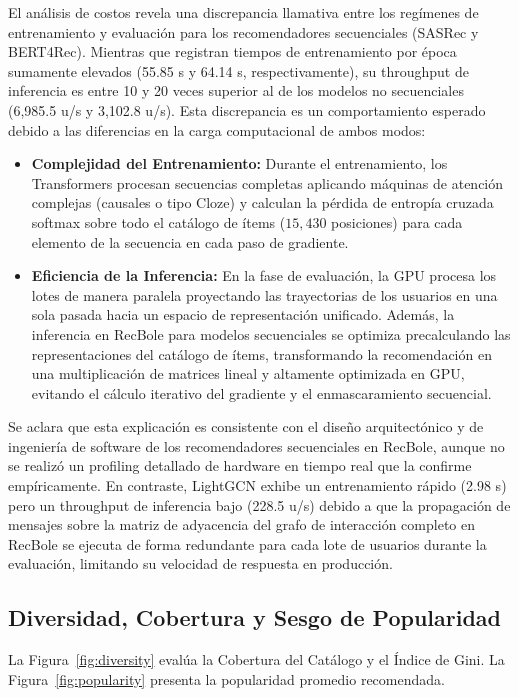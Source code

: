 \documentclass[journal]{IEEEtran}
\begin{document}
El análisis de costos revela una discrepancia llamativa entre los regímenes de entrenamiento y evaluación para los recomendadores secuenciales (SASRec y BERT4Rec). Mientras que registran tiempos de entrenamiento por época sumamente elevados (55.85 s y 64.14 s, respectivamente), su throughput de inferencia es entre 10 y 20 veces superior al de los modelos no secuenciales (6,985.5 u/s y 3,102.8 u/s). Esta discrepancia es un comportamiento esperado debido a las diferencias en la carga computacional de ambos modos:
\begin{itemize}
    \item \textbf{Complejidad del Entrenamiento:} Durante el entrenamiento, los Transformers procesan secuencias completas aplicando máquinas de atención complejas (causales o tipo Cloze) y calculan la pérdida de entropía cruzada softmax sobre todo el catálogo de ítems ($15,430$ posiciones) para cada elemento de la secuencia en cada paso de gradiente.
    \item \textbf{Eficiencia de la Inferencia:} En la fase de evaluación, la GPU procesa los lotes de manera paralela proyectando las trayectorias de los usuarios en una sola pasada hacia un espacio de representación unificado. Además, la inferencia en RecBole para modelos secuenciales se optimiza precalculando las representaciones del catálogo de ítems, transformando la recomendación en una multiplicación de matrices lineal y altamente optimizada en GPU, evitando el cálculo iterativo del gradiente y el enmascaramiento secuencial.
\end{itemize}
Se aclara que esta explicación es consistente con el diseño arquitectónico y de ingeniería de software de los recomendadores secuenciales en RecBole, aunque no se realizó un profiling detallado de hardware en tiempo real que la confirme empíricamente. En contraste, LightGCN exhibe un entrenamiento rápido (2.98 s) pero un throughput de inferencia bajo (228.5 u/s) debido a que la propagación de mensajes sobre la matriz de adyacencia del grafo de interacción completo en RecBole se ejecuta de forma redundante para cada lote de usuarios durante la evaluación, limitando su velocidad de respuesta en producción.

\subsection{Diversidad, Cobertura y Sesgo de Popularidad}
La Figura~\ref{fig:diversity} evalúa la Cobertura del Catálogo y el Índice de Gini. La Figura~\ref{fig:popularity} presenta la popularidad promedio recomendada.
\end{document}
